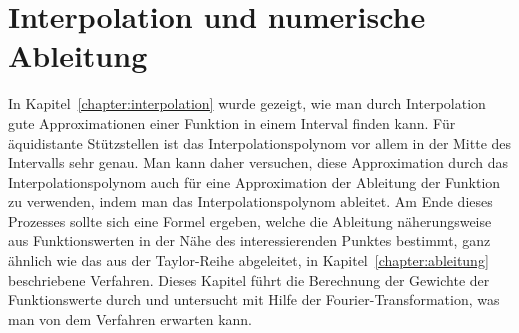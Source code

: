 %
%
%
\chapter{Interpolation und numerische Ableitung\label{chapter:interdiff}}
\rhead{}
\begin{refsection}
%
%
%

{\parindent0pt
In} Kapitel~\ref{chapter:interpolation} wurde gezeigt, wie man durch
Interpolation gute Approximationen einer Funktion in einem Interval
finden kann.
Für äquidistante Stützstellen ist das Interpolationspolynom vor allem in
der Mitte des Intervalls sehr genau.
Man kann daher versuchen, diese Approximation durch das Interpolationspolynom
auch für eine Approximation der Ableitung der Funktion zu verwenden, indem
man das Interpolationspolynom ableitet.
%
Am Ende dieses Prozesses sollte sich eine Formel ergeben, welche die
Ableitung näherungsweise aus Funktionswerten in der Nähe des
interessierenden Punktes bestimmt, ganz ähnlich wie das aus der
Taylor-Reihe abgeleitet, in Kapitel~\ref{chapter:ableitung} beschriebene
Verfahren.
%
Dieses Kapitel führt die Berechnung der Gewichte der Funktionswerte durch
und untersucht mit Hilfe der Fourier-Transformation, was man von dem Verfahren
erwarten kann.
%






\printbibliography[heading=subbibliography]
\end{refsection}
